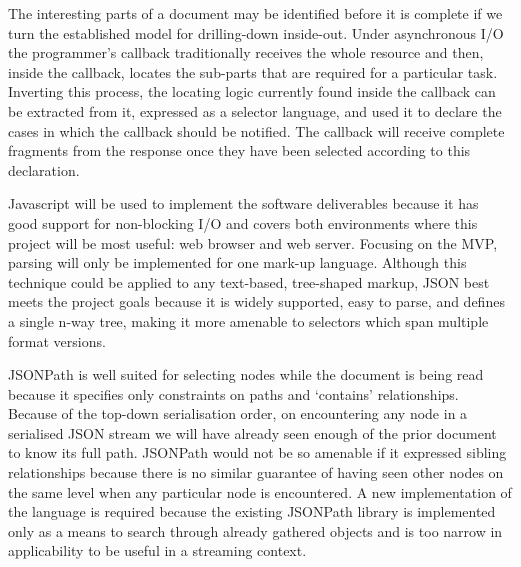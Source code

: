 \documentclass[12pt, ]{article}
\begin{document}
The interesting parts of a document may be identified before it is
complete if we turn the established model for drilling-down inside-out.
Under asynchronous I/O the programmer's callback traditionally receives
the whole resource and then, inside the callback, locates the sub-parts
that are required for a particular task. Inverting this process, the
locating logic currently found inside the callback can be extracted from
it, expressed as a selector language, and used it to declare the cases
in which the callback should be notified. The callback will receive
complete fragments from the response once they have been selected
according to this declaration.

Javascript will be used to implement the software deliverables because
it has good support for non-blocking I/O and covers both environments
where this project will be most useful: web browser and web server.
Focusing on the MVP, parsing will only be implemented for one mark-up
language. Although this technique could be applied to any text-based,
tree-shaped markup, JSON best meets the project goals because it is
widely supported, easy to parse, and defines a single n-way tree, making
it more amenable to selectors which span multiple format versions.

JSONPath is well suited for selecting nodes while the document is being
read because it specifies only constraints on paths and `contains'
relationships. Because of the top-down serialisation order, on
encountering any node in a serialised JSON stream we will have already
seen enough of the prior document to know its full path. JSONPath would
not be so amenable if it expressed sibling relationships because there
is no similar guarantee of having seen other nodes on the same level
when any particular node is encountered. A new implementation of the
language is required because the existing JSONPath library is
implemented only as a means to search through already gathered objects
and is too narrow in applicability to be useful in a streaming context.
\end{document}
